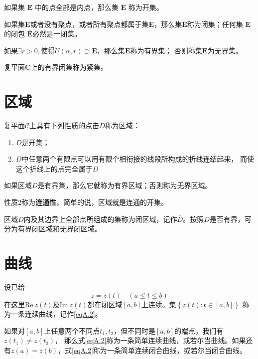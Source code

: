 \documentclass[lang=cn,10pt]{elegantbook}
\begin{document}
\begin{definition}[开集]
	如果集 $\mathbf{E}$ 中的点全部是内点，那么集 $\mathbf{E}$ 称为开集。
\end{definition}

\begin{definition}[闭集]
	如果集$\mathbf{E}$或者没有聚点，或者所有聚点都属于集$\mathbf{E}$，那么集$\mathbf{E}$称为闭集；任何集 $\mathbf{E}$ 的闭包 $\overline{\mathbf{E}}$必然是一闭集。
\end{definition}

\begin{definition}[有界集与无界集]
	如果$\exists r >0,$使得$U(\alpha,r) \supset \mathbf{E}$，那么集$\mathbf{E}$称为有界集；
	否则称集$\mathbf{E}$为无界集。
\end{definition}

\begin{definition}[紧集]
	复平面$\mathbf{C}$上的有界闭集称为紧集。
\end{definition}

\section{区域}
\begin{definition}[区域]
	复平面$\mathcal{C}$上具有下列性质的点击$D$称为区域：
	\begin{enumerate}
		\item $D$是开集；
		\item $D$中任意两个有限点可以用有限个相衔接的线段所构成的折线连结起来，
		      而使这个折线上的点完全属于$D$
	\end{enumerate}
	如果区域$D$是有界集，那么它就称为有界区域；否则称为无界区域。
\end{definition}

性质2称为\textbf{连通性}，简单的说，区域就是连通的开集。

\begin{definition}[闭区域]
	区域$D$内及其边界上全部点所组成的集称为闭区域，记作$\overline{D}$。按照$D$是否有界，可
	分为有界闭区域和无界闭区域。
\end{definition}

\section{曲线}
\begin{definition}
	设已给
	\begin{equation}\label{eqA.2}
		z=z(t)\quad(a\leq t \leq b)
	\end{equation}
	在这里Re$~z(t)$及Im$~z(t)$都在闭区域$[a,b]$上连续。集$\left\{z(t):t\in\left[a,b\right]\right\}$
	称为一条连续曲线，记作\ref{eqA.2}。

	如果对$[a,b]$上任意两个不同点$t_1,t_2$，但不同时是$[a,b]$的端点，我们有$z(t_1)\neq z(t_2)$，
	那么式\ref{eqA.2}称为一条简单连续曲线，或若尔当曲线。如果还有$z(a)= z(b)$，式\ref{eqA.2}称为一条简单连续闭合曲线，或若尔当闭合曲线。
\end{definition}
\end{document}

